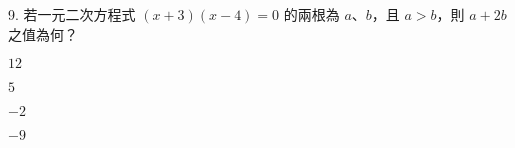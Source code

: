 \documentclass[12pt]{article}
\begin{document}
\begin{problem}
  \item[9.] 若一元二次方程式 $(x + 3)(x - 4) = 0$ 的兩根為 $a$、$b$，且 $a > b$，則 $a + 2b$ 之值為何？
  \begin{choices}
    \item $12$
    \item $5$
    \item $-2$
    \item $-9$
  \end{choices}
\end{problem}
\end{document}
